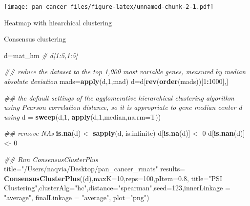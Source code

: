 \documentclass[
]{article}
\newenvironment{Shaded}{\begin{snugshade}}{\end{snugshade}}
\newcommand{\CommentTok}[1]{\textcolor[rgb]{0.56,0.35,0.01}{\textit{#1}}}
\newcommand{\DataTypeTok}[1]{\textcolor[rgb]{0.13,0.29,0.53}{#1}}
\newcommand{\DecValTok}[1]{\textcolor[rgb]{0.00,0.00,0.81}{#1}}
\newcommand{\FloatTok}[1]{\textcolor[rgb]{0.00,0.00,0.81}{#1}}
\newcommand{\KeywordTok}[1]{\textcolor[rgb]{0.13,0.29,0.53}{\textbf{#1}}}
\newcommand{\NormalTok}[1]{#1}
\newcommand{\OperatorTok}[1]{\textcolor[rgb]{0.81,0.36,0.00}{\textbf{#1}}}
\newcommand{\StringTok}[1]{\textcolor[rgb]{0.31,0.60,0.02}{#1}}
\begin{document}
\texttt{[image: pan\_cancer\_files/figure-latex/unnamed-chunk-2-1.pdf]}

Heatmap with hiearchical clustering

\begin{Shaded}
\end{Shaded}

Consensus clustering

\begin{Shaded}
\begin{Highlighting}[]
\NormalTok{d=mat_hm}
\CommentTok{# d[1:5,1:5]}

\CommentTok{## reduce the dataset to the top 1,000 most variable genes, measured by median absolute deviation}
\NormalTok{mads=}\KeywordTok{apply}\NormalTok{(d,}\DecValTok{1}\NormalTok{,mad)}
\NormalTok{d=d[}\KeywordTok{rev}\NormalTok{(}\KeywordTok{order}\NormalTok{(mads))[}\DecValTok{1}\OperatorTok{:}\DecValTok{1000}\NormalTok{],]}

\CommentTok{## the default settings of the agglomerative hierarchical clustering algorithm using Pearson correlation distance, so it is appropriate to gene median center d using}
\NormalTok{d =}\StringTok{ }\KeywordTok{sweep}\NormalTok{(d,}\DecValTok{1}\NormalTok{, }\KeywordTok{apply}\NormalTok{(d,}\DecValTok{1}\NormalTok{,median,}\DataTypeTok{na.rm=}\NormalTok{T))}


\CommentTok{## remove NAs}
\KeywordTok{is.na}\NormalTok{(d) <-}\StringTok{ }\KeywordTok{sapply}\NormalTok{(d, is.infinite)}
\NormalTok{d[}\KeywordTok{is.na}\NormalTok{(d)] <-}\StringTok{ }\DecValTok{0}
\NormalTok{d[}\KeywordTok{is.nan}\NormalTok{(d)] <-}\StringTok{ }\DecValTok{0}


\CommentTok{## Run ConsensusClusterPlus}
\NormalTok{title=}\StringTok{"/Users/naqvia/Desktop/pan_cancer_rmats"}
\NormalTok{results=}\StringTok{ }\KeywordTok{ConsensusClusterPlus}\NormalTok{((d),}\DataTypeTok{maxK=}\DecValTok{10}\NormalTok{,}\DataTypeTok{reps=}\DecValTok{100}\NormalTok{,}\DataTypeTok{pItem=}\FloatTok{0.8}\NormalTok{,}
                     \DataTypeTok{title=}\StringTok{"PSI Clustering"}\NormalTok{,}\DataTypeTok{clusterAlg=}\StringTok{"hc"}\NormalTok{,}\DataTypeTok{distance=}\StringTok{"spearman"}\NormalTok{,}\DataTypeTok{seed=}\DecValTok{123}\NormalTok{,}\DataTypeTok{innerLinkage =} \StringTok{"average"}\NormalTok{, }\DataTypeTok{finalLinkage =} \StringTok{"average"}\NormalTok{, }\DataTypeTok{plot=}\StringTok{"png"}\NormalTok{)}
\end{Highlighting}
\end{Shaded}
\end{document}
